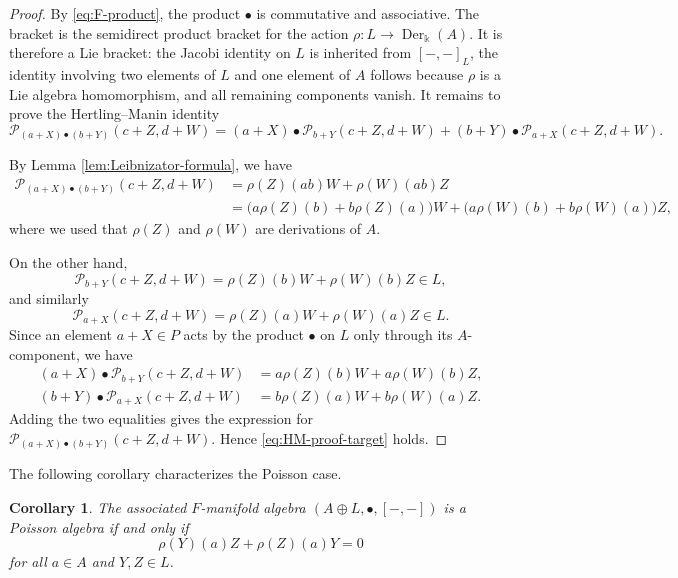 \documentclass[12pt,reqno]{amsart}
\newtheorem{corollary}[theorem]{Corollary}
\theoremstyle{definition}
\theoremstyle{remark}
\newcommand{\kk}{\Bbbk}
\newcommand{\Der}{\operatorname{Der}}
\newcommand{\Pcal}{\mathcal P}
\begin{document}
	\begin{proof}
		By \eqref{eq:F-product}, the product $\bullet$ is commutative and associative.
		The bracket is the semidirect product bracket
		for the action $\rho:L\to\Der_\kk(A)$.  It is therefore a Lie bracket: the
		Jacobi identity on $L$ is inherited from $[-,-]_L$, the identity involving two
		elements of $L$ and one element of $A$ follows because $\rho$ is a Lie algebra
		homomorphism, and all remaining components vanish.  It remains to prove the
		Hertling--Manin identity
		\begin{equation}\label{eq:HM-proof-target}
			\Pcal_{(a+X)\bullet (b+Y)}(c+Z,d+W)
			=(a+X)\bullet\Pcal_{b+Y}(c+Z,d+W)+(b+Y)\bullet\Pcal_{a+X}(c+Z,d+W).
		\end{equation}
		
		By Lemma \ref{lem:Leibnizator-formula}, we have
		\begin{align*}
			\Pcal_{(a+X)\bullet (b+Y)}(c+Z,d+W)
			&=\rho(Z)(ab)W+\rho(W)(ab)Z \\
			&=\bigl(a\rho(Z)(b)+b\rho(Z)(a)\bigr)W
			+\bigl(a\rho(W)(b)+b\rho(W)(a)\bigr)Z,
		\end{align*}
		where we used that $\rho(Z)$ and $\rho(W)$ are derivations of $A$.
		
		On the other hand,
		\[
		\Pcal_{b+Y}(c+Z,d+W)=\rho(Z)(b)W+\rho(W)(b)Z\in L,
		\]
		and similarly
		\[
		\Pcal_{a+X}(c+Z,d+W)=\rho(Z)(a)W+\rho(W)(a)Z\in L.
		\]
		Since an element $a+X\in P$ acts by the product $\bullet$ on $L$ only through
		its $A$-component, we have
		\begin{align*}
			(a+X)\bullet\Pcal_{b+Y}(c+Z,d+W)
			&=a\rho(Z)(b)W+a\rho(W)(b)Z,\\
			(b+Y)\bullet\Pcal_{a+X}(c+Z,d+W)
			&=b\rho(Z)(a)W+b\rho(W)(a)Z.
		\end{align*}
		Adding the two equalities gives the expression for
		$\Pcal_{(a+X)\bullet (b+Y)}(c+Z,d+W)$.  Hence \eqref{eq:HM-proof-target} holds.
	\end{proof}
	
	
	
	
	The following corollary characterizes the Poisson case.
	
	\begin{corollary}\label{cor:poisson-specialization}
		The associated $F$-manifold algebra $(A\oplus L,\bullet,[-,-])$ is a
		Poisson algebra if and only if
		\begin{equation}\label{eq:Poisson-condition}
			\rho(Y)(a)Z+\rho(Z)(a)Y=0
		\end{equation}
		for all $a\in A$ and $Y,Z\in L$.
	\end{corollary}
	
\end{document}
